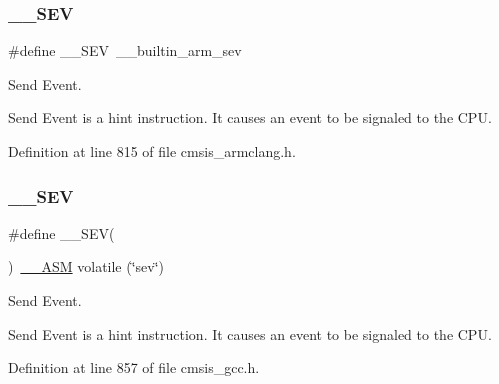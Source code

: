 \subsubsection{\texorpdfstring{\+\_\+\+\_\+\+S\+EV}{\_\_SEV}\hspace{0.1cm}{\footnotesize\ttfamily [2/3]}}
{\footnotesize\ttfamily \#define \+\_\+\+\_\+\+S\+EV~\+\_\+\+\_\+builtin\+\_\+arm\+\_\+sev}



Send Event. 

Send Event is a hint instruction. It causes an event to be signaled to the C\+PU. 

Definition at line 815 of file cmsis\+\_\+armclang.\+h.

\mbox{\label{group___c_m_s_i_s___core___instruction_interface_gafa58e60fcd2176ad58f96947466ea1fa}} 
\subsubsection{\texorpdfstring{\+\_\+\+\_\+\+S\+EV}{\_\_SEV}\hspace{0.1cm}{\footnotesize\ttfamily [3/3]}}
{\footnotesize\ttfamily \#define \+\_\+\+\_\+\+S\+EV(\begin{DoxyParamCaption}{ }\end{DoxyParamCaption})~\hyperlink{cmsis__iccarm_8h_a1378040bcf22428955c6e3ce9c2053cd}{\+\_\+\+\_\+\+A\+SM} volatile (\char`\"{}sev\char`\"{})}



Send Event. 

Send Event is a hint instruction. It causes an event to be signaled to the C\+PU. 

Definition at line 857 of file cmsis\+\_\+gcc.\+h.

\mbox{\label{group___c_m_s_i_s___core___instruction_interface_gaac6cc7dd4325d9cb40d3290fa5244b3d}} 
